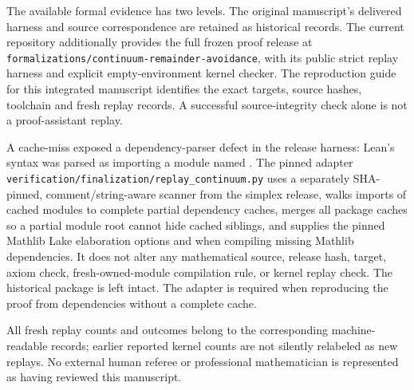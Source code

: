 The available formal evidence has two levels. The original manuscript's
delivered harness and source correspondence are retained as historical records.
The current repository additionally provides the full frozen proof release at
\nolinkurl{formalizations/continuum-remainder-avoidance}, with its public
strict replay harness and explicit empty-environment kernel checker. The
reproduction guide for this integrated manuscript identifies the exact
targets, source hashes, toolchain and fresh replay records. A successful
source-integrity check alone is not a proof-assistant replay.

A cache-miss exposed a dependency-parser defect in the release harness:
Lean's  syntax was parsed as importing a module named
. The pinned adapter
\nolinkurl{verification/finalization/replay_continuum.py}
uses a separately SHA-pinned, comment/string-aware scanner from the simplex
release, walks imports of cached modules to complete partial dependency caches,
merges all package caches so a partial module root cannot hide cached siblings,
and supplies the pinned Mathlib Lake elaboration options
 and  when compiling
missing Mathlib dependencies. It does not alter any mathematical source,
release hash, target, axiom check, fresh-owned-module compilation rule, or
kernel replay check. The historical package is left intact. The adapter is
required when reproducing the proof from dependencies without a complete cache.

All fresh replay counts and outcomes belong to the corresponding machine-readable
records; earlier reported kernel counts are not silently relabeled as new
replays. No external human referee or professional mathematician is represented
as having reviewed this manuscript.
